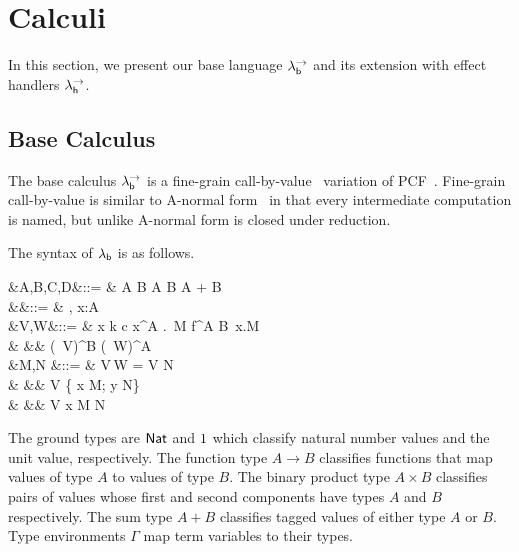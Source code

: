 \documentclass[12pt,phd,lfcs,twoside,openright,logo,leftchapter,normalheadings]{infthesis}
\theoremstyle{plain}
\theoremstyle{definition}
\begin{document}
\section{Calculi}
\label{sec:calculi}
In this section, we present our base language $\lambda^\rightarrow_{\mathsf{b}}$ and its
extension with effect handlers $\lambda^\rightarrow_{\mathsf{h}}$.

\subsection{Base Calculus}
The base calculus $\lambda^\rightarrow_{\mathsf{b}}$ is a fine-grain
call-by-value~\cite{LevyPT03} variation of PCF~\cite{Plotkin77}.
%
Fine-grain call-by-value is similar to A-normal
form~\cite{FlanaganSDF93} in that every intermediate computation is
named, but unlike A-normal form is closed under reduction.

The syntax of $\lambda_{\mathsf{b}}$ is as follows.
{\noindent
  \begin{syntax}
              &A,B,C,D\in\TypeCat  &::= & \Nat \mid \One \mid A \to B \mid A \times B \mid A + B \\
     &\Gamma\in\CtxCat &::= & \cdot \mid \Gamma, x:A \\
        &V,W\in\ValCat  &::= & x \mid k \mid c \mid \lambda x^A .\, M \mid \Rec \; f^{A \to B}\, x.M \\
                     &               &\mid& \Unit \mid {} \mid (\Inl\, V)^B \mid (\Inr\, W)^A\\
  &M,N\in\CompCat
                           &::= & V\,W
                            \mid  \Let\;  = V \; \In \; N \\
                     &     &\mid&\Case \; V \;\{ \Inl \; x \mapsto M; \Inr \; y \mapsto N\}\\
                     &    &\mid& \Return\; V
                           \mid \Let \; x \revto M \; \In \; N \\
\end{syntax}}%
%
The ground types are $\mathsf{Nat}$ and $1$ which classify natural number
values and the unit value, respectively. The function type $A \to B$
classifies functions that map values of type $A$ to values of type
$B$. The binary product type $A \times B$ classifies pairs of values
whose first and second components have types $A$ and $B$
respectively. The sum type $A + B$ classifies tagged values of either
type $A$ or $B$.
%
Type environments $\Gamma$ map term variables to their types.
\end{document}
